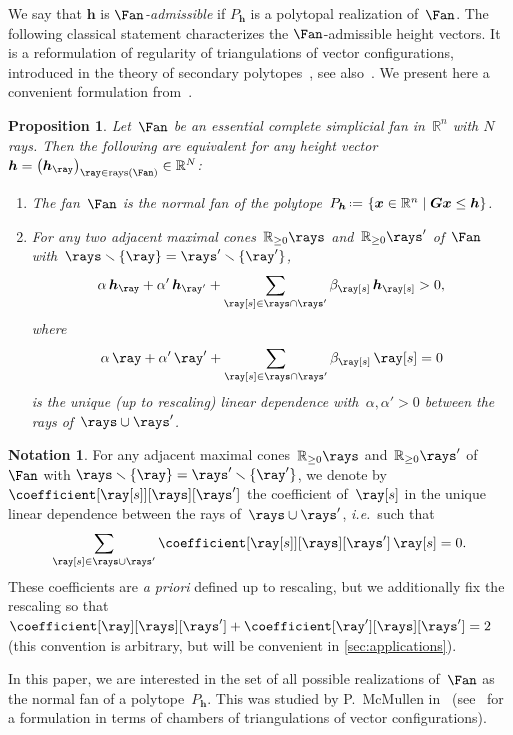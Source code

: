 \documentclass{amsart}
\newtheorem{proposition}[theorem]{Proposition}
\theoremstyle{definition}
\newtheorem{notation}[theorem]{Notation}
\newcommand{\R}{\mathbb{R}} %
\renewcommand{\b}[1]{{\boldsymbol{#1}}} %
\newcommand{\set}[2]{\left\{ #1 \;\middle|\; #2 \right\}} %
\newcommand{\ssm}{\smallsetminus} %
\newcommand{\eqdef}{\mbox{\,\raisebox{0.2ex}{\scriptsize\ensuremath{\mathrm:}}\ensuremath{=}\,}} %
\DeclareMathOperator{\oprays}{rays} %
\newcommand{\ie}{\textit{i.e.}~} %
\newcommand{\apriori}{\textit{a priori}} %
\newcommand{\darkblue}{\color{darkblue}} %
\newcommand{\defn}[1]{\textsl{\darkblue #1}} %
\begin{document}
We say that $\b{h}$ is \defn{$\Fan$-admissible} if $P_\b{h}$ is a polytopal realization of~$\Fan$.
The following classical statement characterizes the $\Fan$-admissible height vectors.
It is a reformulation of regularity of triangulations of vector configurations, introduced in the theory of secondary polytopes~\cite{GelfandKapranovZelevinsky}, see also~\cite{DeLoeraRambauSantos}.
We present here a convenient formulation from~\cite[Lem.~2.1]{ChapotonFominZelevinsky}.

\begin{proposition}
\label{prop:characterizationPolytopalFan}
Let~$\Fan$ be an essential complete simplicial fan in~$\R^n$ with $N$ rays. Then the following are equivalent for any height vector~$\b{h}=\left(\b{h}_{\ray}\right)_{\ray \in \oprays(\Fan)}\in \R^N$:
\begin{enumerate}
\item The fan~$\Fan$ is the normal fan of the polytope~$P_\b{h} \eqdef \set{\b{x} \in \R^n}{\b{G}\b{x} \le \b{h}}$.
\item For any two adjacent maximal cones~$\R_{\ge0}\rays$ and~$\R_{\ge0}\rays'$ of~$\Fan$ with~$\rays \ssm \{\ray\} = \rays' \ssm \{\ray'\}$,
\[
\alpha \, \b{h}_{\ray} + \alpha' \, \b{h}_{\ray'} + \sum_{\ray[s] \in \rays \cap \rays'} \beta_{\ray[s]} \, \b{h}_{\ray[s]} > 0,
\]
where
\[
\alpha \, \ray + \alpha' \, \ray' + \sum_{\ray[s] \in \rays \cap \rays'} \beta_{\ray[s]} \, \ray[s] = 0
\]
is the unique (up to rescaling) linear dependence with~$\alpha, \alpha' > 0$ between the rays of~$\rays \cup \rays'$.
\end{enumerate}
\end{proposition}

\begin{notation}
For any adjacent maximal cones~$\R_{\ge0}\rays$ and~$\R_{\ge0}\rays'$ of~$\Fan$ with ${\rays \ssm \{\ray\} = \rays' \ssm \{\ray'\}}$, we denote by~$\coefficient[{\ray[s]}][\rays][\rays']$ the coefficient of~$\ray[s]$ in the unique linear dependence between the rays of~$\rays \cup \rays'$, \ie such that
\[
\sum_{\ray[s] \in \rays \cup \rays'} \coefficient[{\ray[s]}][\rays][\rays'] \, \ray[s] = 0.
\]
These coefficients are \apriori{} defined up to rescaling, but we additionally fix the rescaling so that~${\coefficient[\ray][\rays][\rays'] + \coefficient[\ray'][\rays][\rays'] = 2}$ (this convention is arbitrary, but will be convenient in \cref{sec:applications}).
\end{notation}

In this paper, we are interested in the set of all possible realizations of~$\Fan$ as the normal fan of a polytope~$P_\b{h}$. This was studied by P.~McMullen in~\cite{McMullen-typeCone} (see~\cite[Sect.~9.5]{DeLoeraRambauSantos} for a formulation in terms of chambers of triangulations of vector configurations).
\end{document}
